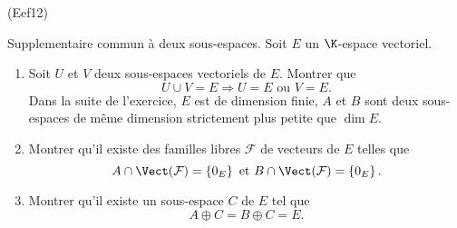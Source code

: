 \begin{tiny}(Eef12)\end{tiny} Supplementaire commun à deux sous-espaces.\newline
Soit $E$ un $\K$-espace vectoriel.
\begin{enumerate}
 \item Soit $U$ et $V$ deux sous-espaces vectoriels de $E$. Montrer que
 \[
  U \cup V = E \Rightarrow U = E \text{ ou } V = E.
 \]
 Dans la suite de l'exercice, $E$ est de dimension finie, $A$ et $B$ sont deux sous-espaces de même dimension strictement plus petite que $\dim E$.
 \item Montrer qu'il existe des familles libres $\mathcal{F}$ de vecteurs de $E$ telles que 
\[
 A \cap \Vect(\mathcal{F}) = \left\lbrace 0_E\right\rbrace \text{ et } B \cap \Vect(\mathcal{F}) = \left\lbrace 0_E\right\rbrace.
\]
 \item Montrer qu'il existe un sous-espace $C$ de $E$ tel que
\[
 A \oplus C = B \oplus C = E.
\]

\end{enumerate}
